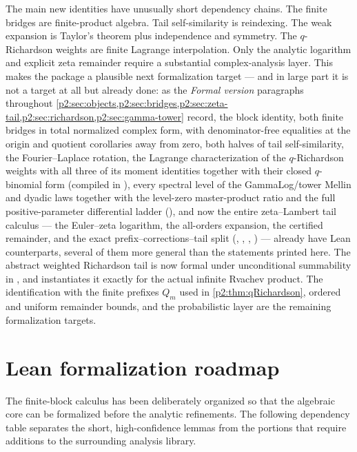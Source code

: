\documentclass[11pt,oneside]{article}
\numberwithin{equation}{section}
\theoremstyle{definition}
\theoremstyle{remark}
\begin{document}
The main new identities have unusually short dependency chains.  The finite bridges are
finite-product algebra.  Tail self-similarity is reindexing.  The weak expansion is Taylor's
theorem plus independence and symmetry.  The $q$-Richardson weights are finite Lagrange
interpolation.  Only the analytic logarithm and explicit zeta remainder require a substantial
complex-analysis layer.  This makes the package a plausible next formalization target --- and
in large part it is not a target at all but already done: as the \emph{Formal version}
paragraphs throughout \cref{p2:sec:objects,p2:sec:bridges,p2:sec:zeta-tail,p2:sec:richardson,p2:sec:gamma-tower}
record, the block identity, both finite bridges in total normalized complex form, with
denominator-free equalities at the origin and quotient corollaries away from zero, both halves of
tail self-similarity, the Fourier--Laplace rotation, the Lagrange characterization of the
$q$-Richardson weights with all three of its moment identities together with their closed
$q$-binomial form (compiled in ), every spectral
level of the GammaLog/tower Mellin and dyadic laws together with the level-zero
master-product ratio and the full positive-parameter differential ladder
(), and now the entire zeta--Lambert tail calculus --- the Euler--zeta
logarithm, the all-orders expansion, the certified remainder, and the exact
prefix--corrections--tail split (, ,
, ) --- already have Lean
counterparts, several of them more general than the statements printed here.  The abstract
weighted Richardson tail is now formal under unconditional summability in
, and 
instantiates it exactly for the actual infinite Rvachev product.  The
identification with the finite prefixes \(Q_m\) used in
\cref{p2:thm:qRichardson}, ordered and uniform remainder bounds, and the
probabilistic layer are the remaining formalization targets.

\section{Lean formalization roadmap}
\label{p2:sec:formalization}

The finite-block calculus has been deliberately organized so that the algebraic core can be
formalized before the analytic refinements.  The following dependency table separates the
short, high-confidence lemmas from the portions that require additions to the surrounding
analysis library.
\end{document}
